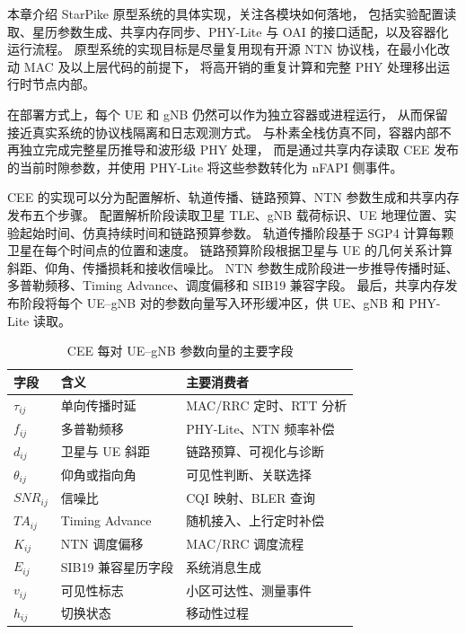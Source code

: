 


本章介绍 StarPike 原型系统的具体实现，关注各模块如何落地，
包括实验配置读取、星历参数生成、共享内存同步、PHY-Lite 与 OAI 的接口适配，以及容器化运行流程。
原型系统的实现目标是尽量复用现有开源 NTN 协议栈，在最小化改动 MAC 及以上层代码的前提下，
将高开销的重复计算和完整 PHY 处理移出运行时节点内部。

在部署方式上，每个 UE 和 gNB 仍然可以作为独立容器或进程运行，
从而保留接近真实系统的协议栈隔离和日志观测方式。
与朴素全栈仿真不同，容器内部不再独立完成完整星历推导和波形级 PHY 处理，
而是通过共享内存读取 CEE 发布的当前时隙参数，并使用 PHY-Lite 将这些参数转化为 nFAPI 侧事件。


CEE 的实现可以分为配置解析、轨道传播、链路预算、NTN 参数生成和共享内存发布五个步骤。
配置解析阶段读取卫星 TLE、gNB 载荷标识、UE 地理位置、实验起始时间、仿真持续时间和链路预算参数。
轨道传播阶段基于 SGP4 计算每颗卫星在每个时间点的位置和速度。
链路预算阶段根据卫星与 UE 的几何关系计算斜距、仰角、传播损耗和接收信噪比。
NTN 参数生成阶段进一步推导传播时延、多普勒频移、Timing Advance、调度偏移和 SIB19 兼容字段。
最后，共享内存发布阶段将每个 UE--gNB 对的参数向量写入环形缓冲区，供 UE、gNB 和 PHY-Lite 读取。

\begin{table}[H]
    \renewcommand{\arraystretch}{1.2}
    \centering\wuhao
    \caption{CEE 每对 UE--gNB 参数向量的主要字段} \label{tab_cee_fields} \vspace{2mm}
    \begin{tabularx}{\textwidth} {
        >{\centering\arraybackslash}p{}
        >{\centering\arraybackslash}p{}
        >{\centering\arraybackslash}X
    }
    \toprule[1.5pt]
        字段 & 含义 & 主要消费者 \\
    \midrule[1pt]
        $\tau_{ij}$ & 单向传播时延 & MAC/RRC 定时、RTT 分析 \\
        $f_{ij}$ & 多普勒频移 & PHY-Lite、NTN 频率补偿 \\
        $d_{ij}$ & 卫星与 UE 斜距 & 链路预算、可视化与诊断 \\
        $\theta_{ij}$ & 仰角或指向角 & 可见性判断、关联选择 \\
        $SNR_{ij}$ & 信噪比 & CQI 映射、BLER 查询 \\
        $TA_{ij}$ & Timing Advance & 随机接入、上行定时补偿 \\
        $K_{ij}$ & NTN 调度偏移 & MAC/RRC 调度流程 \\
        $E_{ij}$ & SIB19 兼容星历字段 & 系统消息生成 \\
        $v_{ij}$ & 可见性标志 & 小区可达性、测量事件 \\
        $h_{ij}$ & 切换状态 & 移动性过程 \\
    \bottomrule[1.5pt]
    \end{tabularx}
\end{table}

